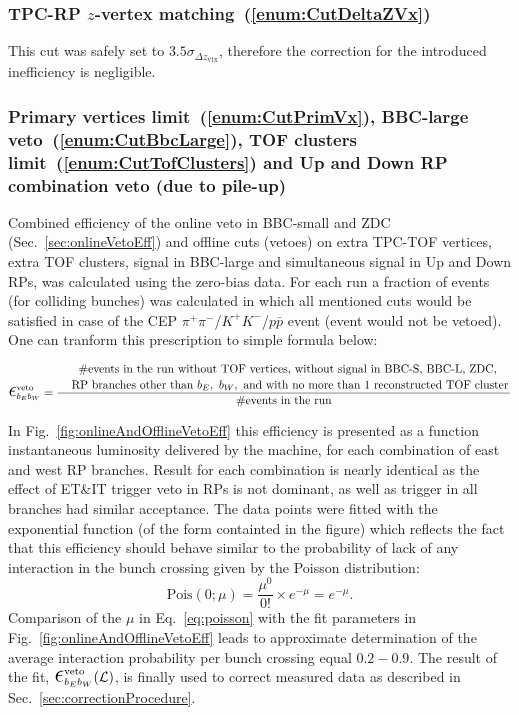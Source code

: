 \subsubsection{TPC-RP \texorpdfstring{$z$}{z}-vertex matching~(\ref{enum:CutDeltaZVx})}

This cut was safely set to $3.5\sigma_{\Delta z_{\text{vtx}}}$, therefore the correction for the introduced inefficiency is negligible.

\subsubsection{Primary vertices limit~(\ref{enum:CutPrimVx}), BBC-large veto~(\ref{enum:CutBbcLarge}), TOF clusters limit~(\ref{enum:CutTofClusters}) and Up and Down RP combination veto (due to pile-up)}\label{sec:onlineAndOfflineVetoEff}

Combined efficiency of the online veto in BBC-small and ZDC (Sec.~\ref{sec:onlineVetoEff}) and offline cuts (vetoes) on extra TPC-TOF vertices, extra TOF clusters, signal in BBC-large and simultaneous signal in Up and Down RPs, was calculated using the zero-bias data. For each run a fraction of events (for colliding bunches) was calculated in which all mentioned cuts would be satisfied in case of the CEP $\pi^{+}\pi^{-}$/$K^{+}K^{-}$/$p\bar{p}$ event (event would not be vetoed). One can tranform this prescription to simple formula below:

\begin{equation}
 \mbox{\LARGE$\epsilon$}^{\text{veto}}_{b_{E}b_{W}}=\dfrac{\splitdfrac{~~~~~\text{\#events in the run without TOF vertices, without signal in BBC-S, BBC-L, ZDC,}}{\text{RP branches other than} ~b_{E},~b_{W},~\text{and with no more than 1 reconstructed TOF cluster}}}{\text{\#events in the run}}
\end{equation}

In Fig.~\ref{fig:onlineAndOfflineVetoEff} this efficiency is presented as a function instantaneous luminosity delivered by the machine, for each combination of east and west RP branches. Result for each combination is nearly identical as the effect of ET\&IT trigger veto in RPs is not dominant, as well as trigger in all branches had similar acceptance. The data points were fitted with the exponential function (of the form containted in the figure) which reflects the fact that this efficiency should behave similar to the probability of lack of any interaction in the bunch crossing given by the Poisson distribution:
\begin{equation}\label{eq:poisson}
 \text{Pois}(0;\mu) = \frac{\mu^{0}}{0!} \times e^{-\mu} = e^{-\mu}.
\end{equation}
Comparison of the $\mu$ in Eq.~\eqref{eq:poisson} with the fit parameters in Fig.~\ref{fig:onlineAndOfflineVetoEff} leads to approximate determination of the average interaction probability per bunch crossing equal $0.2-0.9$. The result of the fit, $ \mbox{\LARGE$\epsilon$}^{\text{veto}}_{b_{E}b_{W}}(\mathcal{L})$, is finally used to correct measured data as described in Sec.~\ref{sec:correctionProcedure}. 

